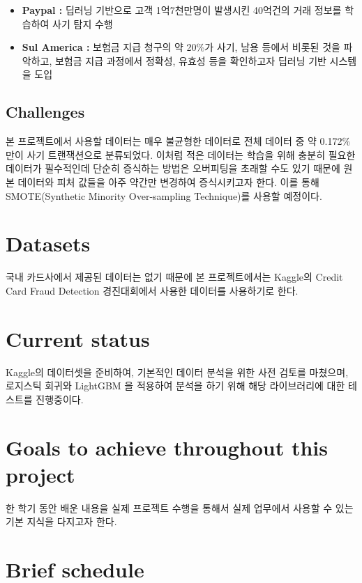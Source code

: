\documentclass{article}
\begin{document}
\begin{itemize}
\item \textbf{Paypal : } 딥러닝 기반으로 고객 1억7천만명이 발생시킨 40억건의 거래 정보를 학습하여 사기 탐지 수행
\item \textbf{Sul America : } 보험금 지급 청구의 약 20\%가 사기, 남용 등에서 비롯된 것을 파악하고, 보험금 지급 과정에서 정확성, 유효성 등을 확인하고자 딥러닝 기반 시스템을 도입
\end{itemize}

\subsection{Challenges}

본 프로젝트에서 사용할 데이터는 매우 불균형한 데이터로 전체 데이터 중 약 0.172\% 만이 사기 트랜잭션으로 분류되었다. 이처럼 적은 데이터는 학습을 위해 충분히 필요한 데이터가 필수적인데 단순히 증식하는 방법은 오버피팅을 초래할 수도 있기 때문에 원본 데이터와 피처 값들을 아주 약간만 변경하여 증식시키고자 한다. 이를 통해 SMOTE(Synthetic Minority Over-sampling Technique)를 사용할 예정이다.

\section{Datasets}

국내 카드사에서 제공된 데이터는 없기 때문에 본 프로젝트에서는 Kaggle의 Credit Card Fraud Detection 경진대회에서 사용한 데이터를 사용하기로 한다.

\section{Current status}

Kaggle의 데이터셋을 준비하여, 기본적인 데이터 분석을 위한 사전 검토를 마쳤으며, 로지스틱 회귀와 LightGBM 을 적용하여 분석을 하기 위해 해당 라이브러리에 대한 테스트를 진행중이다.

\section{Goals to achieve throughout this project}

한 학기 동안 배운 내용을 실제 프로젝트 수행을 통해서 실제 업무에서 사용할 수 있는 기본 지식을 다지고자 한다.

\section{Brief schedule}
\end{document}
